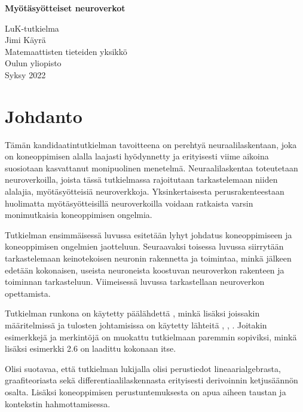 \documentclass[12pt,a4paper,finnish,oneside,titlepage]{article}
\theoremstyle{plain}
\theoremstyle{definition}
\theoremstyle{remark}
\begin{document}
\begin{titlepage}
\vspace*{5.5cm}	  %
\begin{center}
\LARGE{\textbf{Myötäsyötteiset neuroverkot}}
\end{center}
\vfill    %
\begin{flushright}
LuK-tutkielma\\
Jimi Käyrä\\
Matemaattisten tieteiden yksikkö\\
Oulun yliopisto\\
Syksy 2022
\end{flushright}
\end{titlepage}

\tableofcontents
\newpage


\section*{Johdanto}
Tämän kandidaatintutkielman tavoitteena on perehtyä neuraalilaskentaan, joka on koneoppimisen alalla laajasti hyödynnetty ja erityisesti viime aikoina suosiotaan kasvattanut monipuolinen menetelmä. Neuraalilaskentaa toteutetaan neuroverkoilla, joista tässä tutkielmassa rajoitutaan tarkastelemaan niiden alalajia, myötäsyötteisiä neuroverkkoja. Yksinkertaisesta perusrakenteestaan huolimatta myötäsyötteisillä neuroverkoilla voidaan ratkaista varsin monimutkaisia koneoppimisen ongelmia.

Tutkielman ensimmäisessä luvussa esitetään lyhyt johdatus koneoppimiseen ja koneoppimisen ongelmien jaotteluun. Seuraavaksi toisessa luvussa siirrytään tarkastelemaan keinotekoisen neuronin rakennetta ja toimintaa, minkä jälkeen edetään kokonaisen, useista neuroneista koostuvan neuroverkon rakenteen ja toiminnan tarkasteluun. Viimeisessä luvussa tarkastellaan neuroverkon opettamista.

Tutkielman runkona on käytetty päälähdettä \cite{Z2b}, minkä lisäksi joissakin määritelmissä ja tulosten johtamisissa on käytetty lähteitä \cite{deriv}, \cite{net}, \cite{stanf}. Joitakin esimerkkejä ja merkintöjä on muokattu tutkielmaan paremmin sopiviksi, minkä lisäksi esimerkki 2.6 on laadittu kokonaan itse.

Olisi suotavaa, että tutkielman lukijalla olisi perustiedot lineaarialgebrasta, graafiteoriasta sekä differentiaalilaskennasta erityisesti derivoinnin ketjusäännön osalta. Lisäksi koneoppimisen perustuntemuksesta on apua aiheen taustan ja kontekstin hahmottamisessa.
\clearpage
\end{document}
